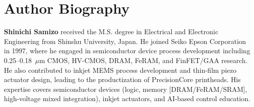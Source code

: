 \documentclass[conference]{IEEEtran}
\begin{document}
\section*{Author Biography}
\textbf{Shinichi Samizo} received the M.S. degree in Electrical and Electronic Engineering from Shinshu University, Japan. He joined Seiko Epson Corporation in 1997, where he engaged in semiconductor device process development including 0.25–0.18~$\mu$m CMOS, HV-CMOS, DRAM, FeRAM, and FinFET/GAA research. He also contributed to inkjet MEMS process development and thin-film piezo actuator design, leading to the productization of PrecisionCore printheads. His expertise covers semiconductor devices (logic, memory [DRAM/FeRAM/SRAM], high-voltage mixed integration), inkjet actuators, and AI-based control education.
\end{document}
